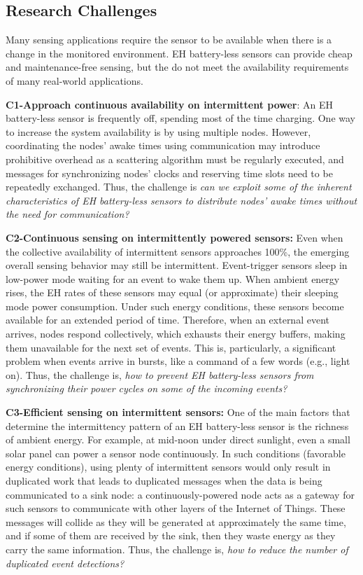 \subsection{Research Challenges}
Many sensing applications require the sensor to be available when there is a change in the monitored environment.
EH battery-less sensors can provide cheap and maintenance-free sensing, but the do not meet the availability requirements of many real-world applications. 

\noindent\textbf{C1-Approach continuous availability on intermittent power}: 
An EH battery-less sensor is frequently off, spending most of the time charging. 
One way to increase the system availability is by using multiple nodes.
However, coordinating the nodes' awake times using communication may introduce prohibitive overhead as a scattering algorithm must be regularly executed, and messages for synchronizing nodes' clocks and reserving time slots need to be repeatedly exchanged.
Thus, the challenge is \emph{can we exploit some of the inherent characteristics of EH battery-less sensors to distribute nodes' awake times without the need for communication?}

\noindent\textbf{C2-Continuous sensing on intermittently powered sensors:}  
Even when the collective availability of intermittent sensors approaches 100\%, the emerging overall sensing behavior may still be intermittent. 
Event-trigger sensors sleep in low-power mode waiting for an event to wake them up. 
When ambient energy rises, the EH rates of these sensors may equal (or approximate) their sleeping mode power consumption.
Under such energy conditions, these sensors become available for an extended period of time. 
Therefore, when an external event arrives, nodes respond collectively, which exhausts their energy buffers, making them unavailable for the next set of events. 
This is, particularly, a significant problem when events arrive in bursts, like a command of a few words (e.g., light on). 
Thus, the challenge is, \emph{how to prevent EH battery-less sensors from synchronizing their power cycles on some of the incoming events?}

\noindent\textbf{C3-Efficient sensing on intermittent sensors:} 
One of the main factors that determine the intermittency pattern of an EH battery-less sensor is the richness of ambient energy. 
For example, at mid-noon under direct sunlight, even a small solar panel can power a sensor node continuously. 
In such conditions (favorable energy conditions), using plenty of intermittent sensors would only result in duplicated work that leads to duplicated messages when the data is being communicated to a sink node: a continuously-powered node acts as a gateway for such sensors to communicate with other layers of the Internet of Things. These messages will collide as they will be generated at approximately the same time, and if some of them are received by the sink, then they waste energy as they carry the same information. Thus, the challenge is, \emph{how to reduce the number of duplicated event detections?} 
%
